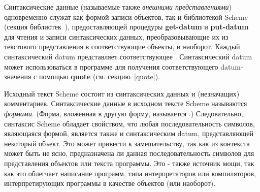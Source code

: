 Синтаксические данные (называемые также \textit{внешними представлениями}) одновременно служат как формой записи объектов, так и библиотекой Scheme
{\bfseries{}} (секция библиотек~),
предоставляющей процедуры {\cf\bfseries get-datum} и {\cf\bfseries put-datum} для чтения и
записи синтаксических данных, преобразовывающие их из текстового представления в
соответствующие объекты, и наоборот. Каждый синтаксический datum представляет соответствующее
. Синтаксический datum может использоваться в программе для
получения соответствующего datum-значения с помощью {\cf\bfseries quote}
(см. секцию~\ref{quote}).

Исходный текст Scheme состоит из синтаксических данных и (незначащих)
комментариев. Синтаксические данные в исходном тексте Scheme называются
\textit{формами}. (Форма, вложенная в другую форму, называется
.) Следовательно, синтаксис Scheme обладает свойством, что любая
последовательность символов, являющаяся формой, является также и синтаксическим datum,
представляющей некоторый объект. Это может привести к замешательству, так как из контекста может
быть не ясно, предназначена ли данная последовательность символов для представления объектов или
текста программы. Это - также источник мощи, так как это облегчает написание программ,
типа интерпретаторов или компиляторов, интерпретирующих программы в качестве объектов (или наоборот).

